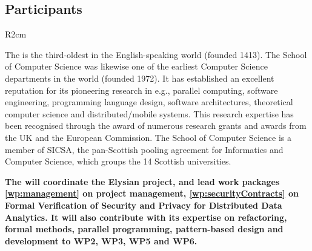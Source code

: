 \documentclass[a4paper,11pt]{article}
\newcommand{\project}[1]{\textbf{#1}\xspace}
\newcommand{\SECURITY}{\project{Elysian}}
\newcommand{\TheProject}{\SECURITY}
\begin{document}
\subsection{Participants}

\begin{wrapfigure}{R}{2cm}
\vspace{-3.95cm}
\hfill {}
\vspace{-1cm}
\end{wrapfigure}

\label{sec:participantUSTAN}

The \SAlong{} is the third-oldest in the English-speaking world (founded 1413).
The School of Computer Science was likewise one of the earliest Computer Science departments in the world (founded 1972).
It has established an excellent reputation for its pioneering research in e.g.,
parallel computing, software engineering, programming language design,
software architectures, theoretical computer science and
distributed/mobile systems.  This research expertise has been
recognised through the award of numerous research grants and
awards from the UK and the European Commission. The School of Computer Science is a member of SICSA, the pan-Scottish pooling agreement for Informatics and Computer Science, which groups the 14 Scottish universities.

\vspace{10pt}
\textbf{The \SAlong{} will coordinate the \TheProject{} project, and lead work packages \ref{wp:management} on project management, \ref{wp:securityContracts} on Formal Verification of Security and Privacy for Distributed Data Analytics. It will also contribute with its expertise on refactoring, formal methods, parallel programming, pattern-based design and development to WP2, WP3, WP5 and WP6.}


\vspace{10pt}
\end{document}
